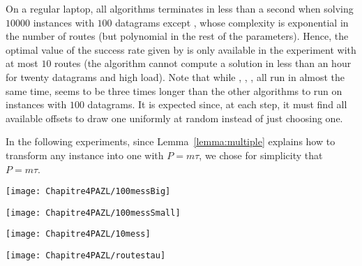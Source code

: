 On a regular laptop, all algorithms terminates in less than a second when solving $10000$ instances with $100$ datagrams except \ESCA, whose complexity is exponential in the number of routes (but polynomial in the rest of the parameters). Hence, the optimal value of the success rate given by \ESCA is only available in the experiment with at most $10$ routes (the algorithm cannot compute a solution in less than an hour for twenty datagrams and high load). 
Note that while \firstfit, \compactpair, \metaoffset, \compactfit all run in almost the same time,
\greedyuniform seems to be three times longer than the other algorithms to run on instances with $100$ datagrams. It is expected since, at each step, it must find all available offsets to draw one uniformly at random instead of just choosing one.

In the following experiments, since Lemma~\ref{lemma:multiple} explains how to transform any instance into one with  $P = m\tau$, we chose for simplicity that $P = m\tau$.

\begin{minipage}[c]{.49\linewidth}

\begin{center}
\texttt{[image: Chapitre4PAZL/100messBig]}

\label{fig:100messBig}
\end{center} 
\end{minipage}
\begin{minipage}[c]{.45\linewidth}
\begin{center}  
\texttt{[image: Chapitre4PAZL/100messSmall]}
\label{fig:100messSmall}
\end{center}
\end{minipage}



\begin{minipage}[c]{.49\linewidth}

\begin{center}
\texttt{[image: Chapitre4PAZL/10mess]}
\end{center}
\label{fig:10mess}
\end{minipage}
\begin{minipage}[c]{.45\linewidth}
\begin{center}
\texttt{[image: Chapitre4PAZL/routestau]}
\end{center}
\label{fig:shortroutes}
\end{minipage}

